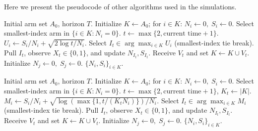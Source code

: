 \documentclass[11pt]{article}
\begin{document}
Here we present the pseudocode of other algorithms used in the simulations.
\begin{algorithm}[H]
\caption{\textbf{Growing UCB1 for Arriving Arms}}
\begin{algorithmic}[1]
\Require Initial arm set $A_0$, horizon $T$.
\State Initialize $K\gets A_0$; for $i\in K$: $N_i\gets0,\;S_i\gets0$.
        \State Select smallest-index arm in $\{i\in K:N_i=0\}$.
    \Else
        \State $t\gets \max\{2,\text{current time}+1\}$.
            \State $U_i\gets S_i/N_i+\sqrt{2\log t/N_i}$.
        \EndFor
        \State Select $I_t\in\arg\max_{i\in K}U_i$ (smallest-index tie break).
    \EndIf
    \State Pull $I_t$, observe $X_t\in\{0,1\}$, and update $N_{I_t},S_{I_t}$.
    \State Receive $V_t$ and set $K\gets K\cup V_t$.
        \State Initialize $N_j\gets0,\;S_j\gets0$.
    \EndFor
\EndWhile
\State \Return $\{N_i,S_i\}_{i\in K}$.
\end{algorithmic}
\end{algorithm}

\begin{algorithm}[htbp]
\caption{\textbf{Growing MOSS for Arriving Arms}}
\begin{algorithmic}[1]
\Require Initial arm set $A_0$, horizon $T$.
\State Initialize $K\gets A_0$; for $i\in K$: $N_i\gets0,\;S_i\gets0$.
        \State Select smallest-index arm in $\{i\in K:N_i=0\}$.
    \Else
        \State $t\gets \max\{2,\text{current time}+1\}$, $K_t\gets |K|$.
            \State $M_i\gets S_i/N_i+\sqrt{\log(\max\{1,t/(K_tN_i)\})/N_i}$.
        \EndFor
        \State Select $I_t\in\arg\max_{i\in K}M_i$ (smallest-index tie break).
    \EndIf
    \State Pull $I_t$, observe $X_t\in\{0,1\}$, and update $N_{I_t},S_{I_t}$.
    \State Receive $V_t$ and set $K\gets K\cup V_t$.
        \State Initialize $N_j\gets0,\;S_j\gets0$.
    \EndFor
\EndWhile
\State \Return $\{N_i,S_i\}_{i\in K}$.
\end{algorithmic}
\end{algorithm}
\end{document}
